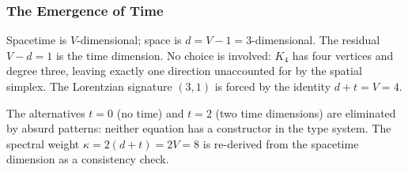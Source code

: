 \documentclass[11pt,a4paper]{book}
\begin{document}
\begin{code}
\>[0]\AgdaSpace{}%
\AgdaSymbol{:}\AgdaSpace{}%
\AgdaSpace{}%
\<%
\\
\>[0]\AgdaSpace{}%
\AgdaSymbol{()}\<%
\\
%
\\[\AgdaEmptyExtraSkip]%
\>[0]\<%
\\
\>[0]\AgdaSpace{}%
\AgdaSymbol{:}\AgdaSpace{}%
\AgdaSymbol{(}\AgdaSpace{}%
\AgdaSpace{}%
\AgdaSymbol{)}\AgdaSpace{}%
\AgdaSpace{}%
\AgdaSymbol{((}\AgdaSpace{}%
\AgdaSpace{}%
\AgdaSymbol{)}\AgdaSpace{}%
\AgdaSpace{}%
\AgdaSymbol{(}\AgdaSpace{}%
\AgdaSpace{}%
\AgdaSymbol{))}\<%
\\
\>[0]\AgdaSpace{}%
\AgdaSymbol{=}\AgdaSpace{}%
\AgdaSpace{}%
\AgdaOperator{\AgdaInductiveConstructor{,}}\AgdaSpace{}%
\AgdaSymbol{(}\AgdaSpace{}%
\AgdaOperator{\AgdaInductiveConstructor{,}}\AgdaSpace{}%
\AgdaSymbol{)}\<%
\end{code}

\subsubsection*{The Emergence of Time}

Spacetime is $V$-dimensional; space is $d = V - 1 = 3$-dimensional.
The residual $V - d = 1$ is the time dimension.  No choice is involved:
$K_4$ has four vertices and degree three, leaving exactly one direction
unaccounted for by the spatial simplex.  The Lorentzian signature
$(3,1)$ is forced by the identity $d + t = V = 4$.

The alternatives $t = 0$ (no time) and $t = 2$ (two time dimensions) are
eliminated by absurd patterns: neither equation has a constructor in the
type system.  The spectral weight $\kappa = 2(d + t) = 2V = 8$ is
re-derived from the spacetime dimension as a consistency check.
\end{document}
